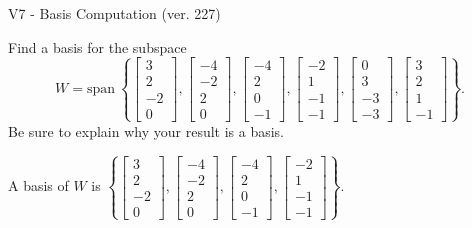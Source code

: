 \begin{exercise}
  \begin{exerciseTitle}V7 - Basis Computation (ver. 227)\end{exerciseTitle}
  \begin{exerciseStatement}
    Find a basis for the subspace 
\[W=\mathrm{span}\ \left\{\left[\begin{array}{r}
3 \\
2 \\
-2 \\
0
\end{array}\right] , \left[\begin{array}{r}
-4 \\
-2 \\
2 \\
0
\end{array}\right] , \left[\begin{array}{r}
-4 \\
2 \\
0 \\
-1
\end{array}\right] , \left[\begin{array}{r}
-2 \\
1 \\
-1 \\
-1
\end{array}\right] , \left[\begin{array}{r}
0 \\
3 \\
-3 \\
-3
\end{array}\right] , \left[\begin{array}{r}
3 \\
2 \\
1 \\
-1
\end{array}\right]\right\}.\]
 Be sure to explain why your result is a basis.


  \end{exerciseStatement}
  \begin{exerciseAnswer}
   A basis of \(W\) is  \(\left\{\left[\begin{array}{r}
3 \\
2 \\
-2 \\
0
\end{array}\right] , \left[\begin{array}{r}
-4 \\
-2 \\
2 \\
0
\end{array}\right] , \left[\begin{array}{r}
-4 \\
2 \\
0 \\
-1
\end{array}\right] , \left[\begin{array}{r}
-2 \\
1 \\
-1 \\
-1
\end{array}\right]\right\}\).
  


  \end{exerciseAnswer}
\end{exercise}